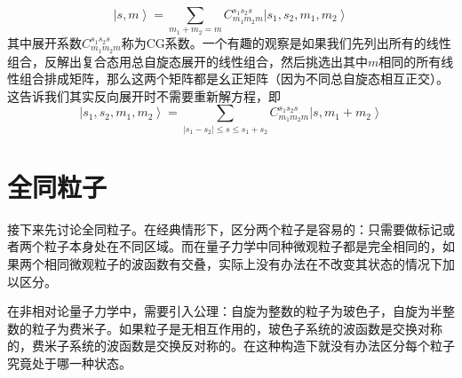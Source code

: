 \documentclass[12pt, a4paper, oneside]{ctexart}
\begin{document}
	\begin{equation}
		\left|s,m\right>=\sum_{m_{1}+m_{2}=m}C_{m_{1}m_{2}m}^{s_{1}s_{2}s}\left|s_{1},s_{2},m_{1},m_{2}\right>
	\end{equation}
	\quad\quad 其中展开系数$C_{m_{1}m_{2}m}^{s_{1}s_{2}s}$称为CG系数。一个有趣的观察是如果我们先列出所有的线性组合，反解出复合态用总自旋态展开的线性组合，然后挑选出其中$m$相同的所有线性组合排成矩阵，那么这两个矩阵都是幺正矩阵（因为不同总自旋态相互正交）。这告诉我们其实反向展开时不需要重新解方程，即
	\begin{equation}
		\left|s_{1},s_{2},m_{1},m_{2}\right>=\sum_{|s_{1}-s_{2}|\le s\le s_{1}+s_{2}}C_{m_{1}m_{2}m}^{s_{1}s_{2}s}\left|s,m_{1}+m_{2}\right>
	\end{equation}
	\section{全同粒子}
	接下来先讨论全同粒子。在经典情形下，区分两个粒子是容易的：只需要做标记或者两个粒子本身处在不同区域。而在量子力学中同种微观粒子都是完全相同的，如果两个相同微观粒子的波函数有交叠，实际上没有办法在不改变其状态的情况下加以区分。\par 
	在非相对论量子力学中，需要引入公理：自旋为整数的粒子为玻色子，自旋为半整数的粒子为费米子。如果粒子是无相互作用的，玻色子系统的波函数是交换对称的，费米子系统的波函数是交换反对称的。在这种构造下就没有办法区分每个粒子究竟处于哪一种状态。
\end{document}
